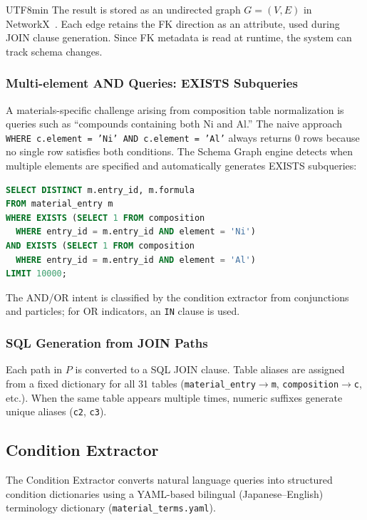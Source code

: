 \documentclass[sn-mathphys,Numbered]{sn-jnl}
\begin{document}
\begin{CJK}{UTF8}{min}
The result is stored as an undirected graph $G = (V, E)$ in NetworkX~\cite{networkx2008}.
Each edge retains the FK direction as an attribute, used during JOIN clause generation.
Since FK metadata is read at runtime, the system can track schema changes.

\subsubsection{Multi-element AND Queries: EXISTS Subqueries}
\label{sec:multi_element}

A materials-specific challenge arising from composition table normalization is
queries such as ``compounds containing both Ni and Al.''
The naive approach \texttt{WHERE c.element = 'Ni' AND c.element = 'Al'}
always returns 0 rows because no single row satisfies both conditions.
The Schema Graph engine detects when multiple elements are specified and
automatically generates EXISTS subqueries:

\begin{lstlisting}[language=SQL,caption={Multi-element AND},label=lst:exists,numbers=none]
SELECT DISTINCT m.entry_id, m.formula
FROM material_entry m
WHERE EXISTS (SELECT 1 FROM composition
  WHERE entry_id = m.entry_id AND element = 'Ni')
AND EXISTS (SELECT 1 FROM composition
  WHERE entry_id = m.entry_id AND element = 'Al')
LIMIT 10000;
\end{lstlisting}

The AND/OR intent is classified by the condition extractor from conjunctions and particles;
for OR indicators, an \texttt{IN} clause is used.

\subsubsection{SQL Generation from JOIN Paths}

Each path in $P$ is converted to a SQL JOIN clause.
Table aliases are assigned from a fixed dictionary for all 31 tables
(\texttt{material\_entry}$\to$\texttt{m},
\texttt{composition}$\to$\texttt{c}, etc.).
When the same table appears multiple times,
numeric suffixes generate unique aliases (\texttt{c2}, \texttt{c3}).

\subsection{Condition Extractor}
\label{sec:entity_extractor}

The Condition Extractor converts natural language queries into
structured condition dictionaries using a YAML-based bilingual
(Japanese--English) terminology dictionary (\texttt{material\_terms.yaml}).


\end{CJK}
\end{document}
